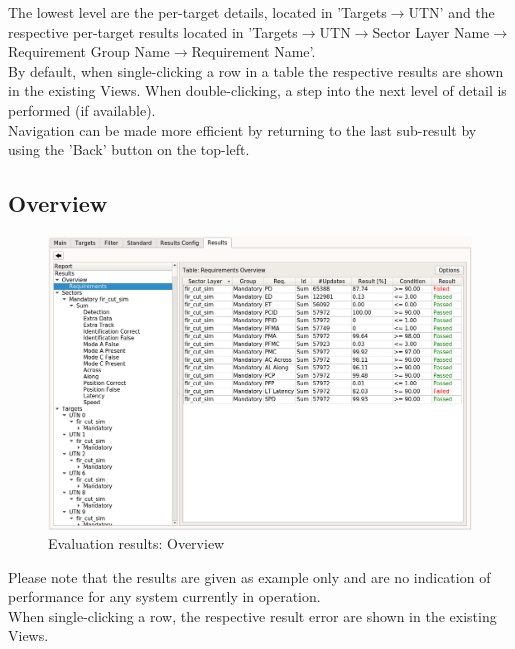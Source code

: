 The lowest level are the per-target details, located in 'Targets$\rightarrow$UTN' and the respective per-target results located in 'Targets$\rightarrow$UTN$\rightarrow$Sector Layer Name$\rightarrow$Requirement Group Name$\rightarrow$Requirement Name'. \\

By default, when single-clicking a row in a table the respective results are shown in the existing Views. When double-clicking, a step into the next level of detail is performed (if available). \\

Navigation can be made more efficient by returning to the last sub-result by using the 'Back' button on the top-left.

\subsection{Overview}
\begin{figure}[H]
  \hspace*{-2cm}
    \includegraphics[width=18cm,frame]{figures/eval_results_overview.png}
  \caption{Evaluation results: Overview}
\end{figure}

Please note that the results are given as example only and are no indication of performance for any system currently in operation. \\

When single-clicking a row, the respective result error are shown in the existing Views.

